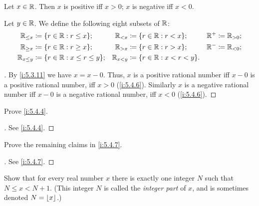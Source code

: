 \begin{ac}\label{i:ac:5.4.3}
  Let \(x \in \mathbb{R}\).
  Then \(x\) is positive iff \(x > 0\);
  \(x\) is negative iff \(x < 0\).

  Let \(y \in \mathbb{R}\).
  We define the following eight subsets of \(\mathbb{R}\):
  \begin{align*}
    \R_{\leq x}   & \coloneqq \set{r \in \R : r \leq x};        & \R_{< x}   & \coloneqq \set{r \in \R : r < x};     & \R^+ & \coloneqq \R_{> 0}; \\
    \R_{\geq x}   & \coloneqq \set{r \in \R : r \geq x};        & \R_{> x}   & \coloneqq \set{r \in \R : r > x};     & \R^- & \coloneqq \R_{< 0}; \\
    \R_{x \leq y} & \coloneqq \set{r \in \R : x \leq r \leq y}; & \R_{x < y} & \coloneqq \set{r \in \R : x < r < y}. &      &
  \end{align*}
\end{ac}

\begin{proof}[]
  By \cref{i:5.3.11} we have \(x = x - 0\).
  Thus, \(x\) is a positive rational number iff \(x - 0\) is a positive rational number, iff \(x > 0\) (\cref{i:5.4.6}).
  Similarly \(x\) is a negative rational number iff \(x - 0\) is a negative rational number, iff \(x < 0\) (\cref{i:5.4.6}).
\end{proof}

\exercisesection

\begin{ex}\label{i:ex:5.4.1}
  Prove \cref{i:5.4.4}.
\end{ex}

\begin{proof}[]
  See \cref{i:5.4.4}.
\end{proof}

\begin{ex}\label{i:ex:5.4.2}
  Prove the remaining claims in \cref{i:5.4.7}.
\end{ex}

\begin{proof}[]
  See \cref{i:5.4.7}.
\end{proof}

\begin{ex}\label{i:ex:5.4.3}
  Show that for every real number \(x\) there is exactly one integer \(N\) such that \(N \leq x < N + 1\).
  (This integer \(N\) is called the \emph{integer part} of \(x\), and is sometimes denoted \(N = \left\lfloor x\right\rfloor\).)
\end{ex}

